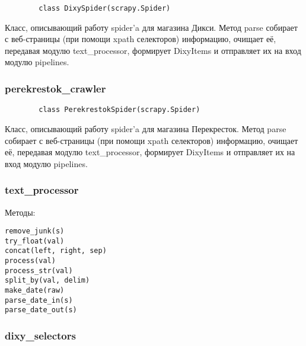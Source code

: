 \begin{small}
    \begin{verbatim}
        class DixySpider(scrapy.Spider)
    \end{verbatim}
\end{small}

Класс, описывающий работу spider'a для магазина Дикси. Метод parse собирает с
веб-страницы (при помощи xpath селекторов) информацию, очищает её, передавая
модулю text\_processor, формирует DixyItems и отправляет их на вход модулю
pipelines.


\subsubsection{perekrestok\_crawler}

\begin{small}
    \begin{verbatim}
        class PerekrestokSpider(scrapy.Spider)
    \end{verbatim}
\end{small}

Класс, описывающий работу spider'a для магазина Перекресток. Метод parse собирает с
веб-страницы (при помощи xpath селекторов) информацию, очищает её, передавая
модулю text\_processor, формирует DixyItems и отправляет их на вход модулю
pipelines.

\subsubsection{text\_processor}

Методы:\\
\begin{small}
    \begin{verbatim}
remove_junk(s)
try_float(val)
concat(left, right, sep)
process(val)
process_str(val)
split_by(val, delim)
make_date(raw)
parse_date_in(s)
parse_date_out(s)
\end{verbatim}
\end{small}

\subsubsection{dixy\_selectors}

